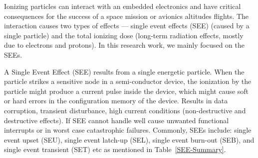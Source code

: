 Ionizing particles can interact with an embedded electronics and have critical consequences for the success of a space mission or avionics altitudes flights. The interaction causes two types of effects ---
single event effects (SEE) (caused by a single particle) and the total ionizing dose (long-term radiation effects, mostly due to electrons and protons). In this research work, we mainly focused on the SEEs.


A Single Event Effect (SEE) results from a single energetic particle. When the particle strikes a sensitive node in a semi-conductor device, the ionization by the particle might produce a current pulse inside the device, which might cause soft or hard errors in the configuration memory of the device. Results in data corruption, transient disturbance, high current conditions (non-destructive and destructive
effects). If SEE cannot handle well cause unwanted functional interrupts or in worst case catastrophic failures. Commonly, SEEs include: single event upset (SEU), single event latch-up (SEL), single event burn-out (SEB), and single event transient (SET) etc as mentioned in Table~\ref{SEE-Summary}. 



